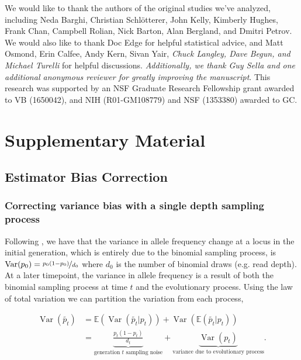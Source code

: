 \documentclass[11pt]{article}
\newcommand{\vb}[1]{{\it \color{blue} #1}}
\newcommand{\beginsupplement}{%
        \setcounter{table}{0}
        \renewcommand{\thetable}{S\arabic{table}}%
        \setcounter{figure}{0}
        \renewcommand{\thefigure}{S\arabic{figure}}%
     }
\newcommand{\E}{\mathbb{E}}
\DeclareMathOperator{\var}{Var}
\begin{document}
We would like to thank the authors of the original studies we've analyzed,
including Neda Barghi, Christian Schl{\"o}tterer, John Kelly, Kimberly Hughes,
Frank Chan, Campbell Rolian, Nick Barton, Alan Bergland, and Dmitri Petrov. We
would also like to thank Doc Edge for helpful statistical advice, and Matt
Osmond, Erin Calfee, Andy Kern, Sivan Yair, \vb{Chuck Langley, Dave Begun, and
Michael Turelli} for helpful discussions. \vb{Additionally, we thank Guy Sella
and one additional anonymous reviewer for greatly improving the manuscript}.
This research was supported by an NSF Graduate Research Fellowship grant
awarded to VB (1650042), and NIH (R01-GM108779) and NSF (1353380) awarded to
GC.

\printbibliography


\setcounter{section}{1}
\section*{Supplementary Material}
\beginsupplement

\subsection{Estimator Bias Correction}
\subsubsection{Correcting variance bias with a single depth sampling process}
\label{supp:depth-var-corr}

Following \textcite{Waples1989-sj}, we have that the variance in allele
frequency change at a locus in the initial generation, which is entirely due to
the binomial sampling process, is $\var(p_0) = \nicefrac{p_0(1-p_0)}{d_0}$
where $d_0$ is the number of binomial draws (e.g. read depth). At a later
timepoint, the variance in allele frequency is a result of both the binomial
sampling process at time $t$ and the evolutionary process. Using the law of
total variation we can partition the variation from each process,

\begin{align}
  \var(\widetilde{p_t}) &= \E(\var(\widetilde{p_t} | p_t)) + \var(\E(\widetilde{p_t}|p_t)) \\
                        &= \underbrace{\frac{p_t(1-p_t)}{d_t}}_\text{generation $t$ sampling noise} + \underbrace{\var(p_t)}_\text{variance due to evolutionary process}.
\end{align}
\end{document}
